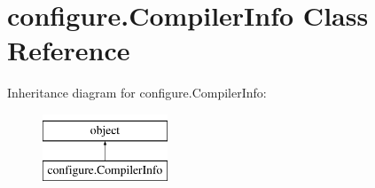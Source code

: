 \hypertarget{classconfigure_1_1CompilerInfo}{\section{configure.\-Compiler\-Info Class Reference}
\label{classconfigure_1_1CompilerInfo}
}
Inheritance diagram for configure.\-Compiler\-Info\-:\begin{figure}[H]
\begin{center}
\leavevmode
\includegraphics[height=2.000000cm]{classconfigure_1_1CompilerInfo}
\end{center}
\end{figure}
